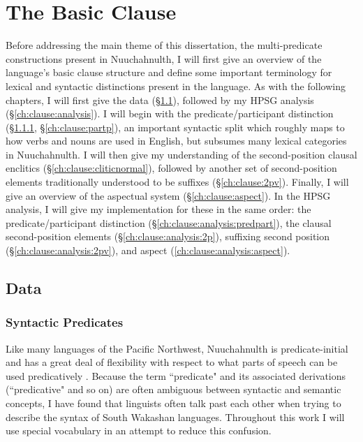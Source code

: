 \chapter{The Basic Clause} \label{ch:clause}

Before addressing the main theme of this dissertation, the multi-predicate constructions present in Nuuchahnulth, I will first give an overview of the language's basic clause structure and define some important terminology for lexical and syntactic distinctions present in the language. As with the following chapters, I will first give the data (\S\ref{ch:clause:data}), followed by my HPSG analysis (\S\ref{ch:clause:analysis}). I will begin with the predicate/participant distinction (\S\ref{ch:clause:predp}, \S\ref{ch:clause:partp}), an important syntactic split which roughly maps to how verbs and nouns are used in English, but subsumes many lexical categories in Nuuchahnulth. I will then give my understanding of the second-position clausal enclitics (\S\ref{ch:clause:cliticnormal}), followed by another set of second-position elements traditionally understood to be suffixes (\S\ref{ch:clause:2pv}). Finally, I will give an overview of the aspectual system (\S\ref{ch:clause:aspect}). In the HPSG analysis, I will give my implementation for these in the same order: the predicate/participant distinction (\S\ref{ch:clause:analysis:predpart}), the clausal second-position elements (\S\ref{ch:clause:analysis:2p}), suffixing second position (\S\ref{ch:clause:analysis:2pv}), and aspect (\ref{ch:clause:analysis:aspect}).

\section{Data} \label{ch:clause:data}

\subsection{Syntactic Predicates} \label{ch:clause:predp}

Like many languages of the Pacific Northwest, Nuuchahnulth is predicate-initial and has a great deal of flexibility with respect to what parts of speech can be used predicatively \citep{sapir1911, swadesh1938, jacobsen1979}. Because the term ``predicate" and its associated derivations (``predicative" and so on) are often ambiguous between syntactic and semantic concepts, I have found that linguists often talk past each other when trying to describe the syntax of South Wakashan languages. Throughout this work I will use special vocabulary in an attempt to reduce this confusion.

